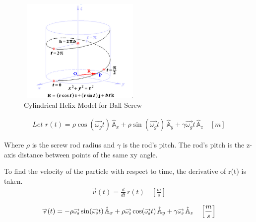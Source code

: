 \documentclass[journal]{IEEEtran}
\begin{document}
                \begin{figure}[h]
                    \centering
                    \includegraphics[width= 6cm, height = 5cm]{Images/Cylinder_coord.png}
                    \caption{Cylindrical Helix Model for Ball Screw}
                    \label{fig:helix}
                \end{figure}
                
                \begin{equation}
                    \begin{split}
                        Let\,\, r(t) = \rho \cos(\overrightarrow{\omega_g}t)\,\hat{\mathbb{A}}_x + 
                                        \rho \sin(\overrightarrow{\omega_g}t)\,\hat{\mathbb{A}}_y +
                                        \gamma \overrightarrow{\omega_g}t\,\hat{\mathbb{A}}_z \,\,\,\,\,\,\left [m\right]
                    \end{split}
                \end{equation}
                                
                Where \(\rho\) is the screw rod radius and \(\gamma\) is the rod's pitch. The rod's pitch is the z-axis distance between points of the same xy angle.
                
                To find the velocity of the particle with respect to time, the derivative of r(t) is taken.
                \begin{equation}
                    \begin{split}
                         \overrightarrow{v}(t) = \frac{d}{dt}\, r(t) \,\,\,\,\,\,\left [\frac{m}{s}\right]
                    \end{split}
                \end{equation}
                    

                \begin{equation}
                    \begin{split}
                        \scriptsize{
                        \overrightarrow{v}(t) = - \rho \overrightarrow{\omega_g} \sin(\overrightarrow{\omega_g}t)\,\hat{\mathbb{A}}_x + 
                        \rho \overrightarrow{\omega_g} \cos(\overrightarrow{\omega_g}t)\,\hat{\mathbb{A}}_y + 
                        \gamma \overrightarrow{\omega_g} \,\hat{\mathbb{A}}_z
                        \,\,\,\,\,\,\left [\frac{m}{s}\right]}
                    \end{split}
                \end{equation}
                
\end{document}
